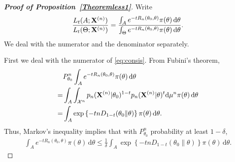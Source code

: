 \documentclass[11pt]{article}
\theoremstyle{plain}
\theoremstyle{definition}
\theoremstyle{remark}
\begin{document}
\begin{appendices}
\begin{proof}[\textbf{Proof of Proposition~\ref{Theoremless1}}]
    Write
    \begin{equation}\label{eq:consis}
           \frac{L_{t} (A;\mathbf{X}^{(n)})}
           {L_{t}(\Theta;\mathbf{X}^{(n)})}
=
\frac{
    \int_{A} e^{-t R_n (\theta_0, \theta)} \pi(\theta) \, \mathrm d \theta
}
{
    \int_{\Theta} e^{-t R_n (\theta_0, \theta)} \pi(\theta) \, \mathrm d \theta
    }
        .
   \end{equation}
       We deal with the numerator and the denominator separately.

First we deal with the numerator of  \eqref{eq:consis}.
From Fubini's theorem,
\begin{align*}
    &P_{\theta_0}^n \int_{A} e^{-t R_n (\theta_0, \theta)} \pi(\theta) \, \mathrm d \theta
    \\
    =&
    \int_{A} \int_{\mathcal X^n} p_n(\mathbf{X}^{(n)} | \theta_0)^{1-t} p_n(\mathbf{X}^{(n)} | \theta)^t \mathrm d \mu^n  \pi(\theta) \, \mathrm d \theta
    \\
    =&
    \int_{A} \exp\left\{ - tn D_{1-t} (\theta_0 \| \theta) \right\}  \pi(\theta) \, \mathrm d \theta.
\end{align*}
Thus, Markov's inequality implies that with $P_{\theta_0}^n$ probability at least $1-\delta$,
\begin{align*}
     \int_{A} e^{-t R_n (\theta_0, \theta)} \pi(\theta) \, \mathrm d \theta
    \leq \frac{1}{\delta}
    \int_{A} \exp\left\{ - tn D_{1-t} (\theta_0 \| \theta) \right\}  \pi(\theta) \, \mathrm d \theta.
\end{align*}
       





\end{proof}
\end{appendices}
\end{document}
